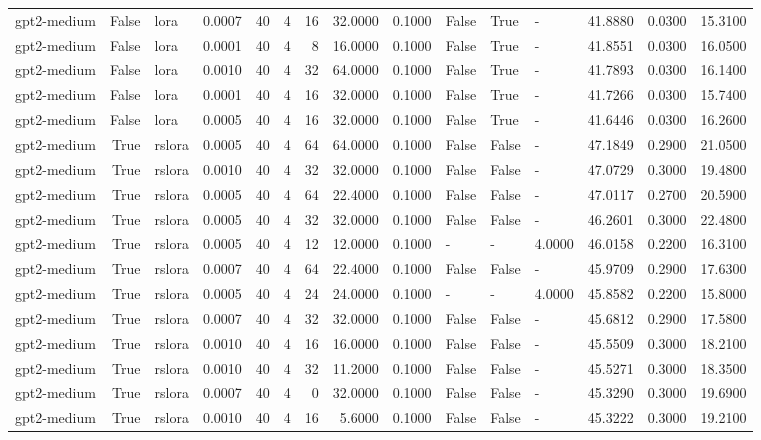 \begin{tabular}{lrlrrrrrrlllrrr}
gpt2-medium & False & lora & 0.0007 & 40 & 4 & 16 & 32.0000 & 0.1000 & False & True & - & 41.8880 & 0.0300 & 15.3100 \\
gpt2-medium & False & lora & 0.0001 & 40 & 4 & 8 & 16.0000 & 0.1000 & False & True & - & 41.8551 & 0.0300 & 16.0500 \\
gpt2-medium & False & lora & 0.0010 & 40 & 4 & 32 & 64.0000 & 0.1000 & False & True & - & 41.7893 & 0.0300 & 16.1400 \\
gpt2-medium & False & lora & 0.0001 & 40 & 4 & 16 & 32.0000 & 0.1000 & False & True & - & 41.7266 & 0.0300 & 15.7400 \\
gpt2-medium & False & lora & 0.0005 & 40 & 4 & 16 & 32.0000 & 0.1000 & False & True & - & 41.6446 & 0.0300 & 16.2600 \\
gpt2-medium & True & rslora & 0.0005 & 40 & 4 & 64 & 64.0000 & 0.1000 & False & False & - & 47.1849 & 0.2900 & 21.0500 \\
gpt2-medium & True & rslora & 0.0010 & 40 & 4 & 32 & 32.0000 & 0.1000 & False & False & - & 47.0729 & 0.3000 & 19.4800 \\
gpt2-medium & True & rslora & 0.0005 & 40 & 4 & 64 & 22.4000 & 0.1000 & False & False & - & 47.0117 & 0.2700 & 20.5900 \\
gpt2-medium & True & rslora & 0.0005 & 40 & 4 & 32 & 32.0000 & 0.1000 & False & False & - & 46.2601 & 0.3000 & 22.4800 \\
gpt2-medium & True & rslora & 0.0005 & 40 & 4 & 12 & 12.0000 & 0.1000 & - & - & 4.0000 & 46.0158 & 0.2200 & 16.3100 \\
gpt2-medium & True & rslora & 0.0007 & 40 & 4 & 64 & 22.4000 & 0.1000 & False & False & - & 45.9709 & 0.2900 & 17.6300 \\
gpt2-medium & True & rslora & 0.0005 & 40 & 4 & 24 & 24.0000 & 0.1000 & - & - & 4.0000 & 45.8582 & 0.2200 & 15.8000 \\
gpt2-medium & True & rslora & 0.0007 & 40 & 4 & 32 & 32.0000 & 0.1000 & False & False & - & 45.6812 & 0.2900 & 17.5800 \\
gpt2-medium & True & rslora & 0.0010 & 40 & 4 & 16 & 16.0000 & 0.1000 & False & False & - & 45.5509 & 0.3000 & 18.2100 \\
gpt2-medium & True & rslora & 0.0010 & 40 & 4 & 32 & 11.2000 & 0.1000 & False & False & - & 45.5271 & 0.3000 & 18.3500 \\
gpt2-medium & True & rslora & 0.0007 & 40 & 4 & 0 & 32.0000 & 0.1000 & False & False & - & 45.3290 & 0.3000 & 19.6900 \\
gpt2-medium & True & rslora & 0.0010 & 40 & 4 & 16 & 5.6000 & 0.1000 & False & False & - & 45.3222 & 0.3000 & 19.2100 \\

\end{tabular}
